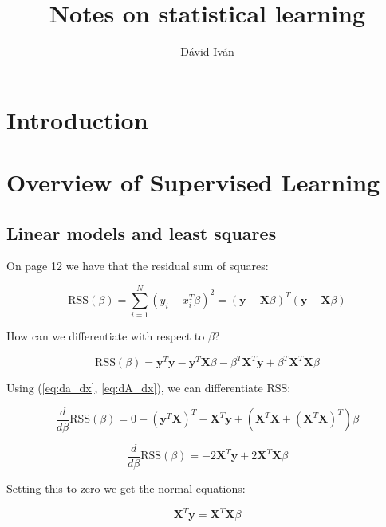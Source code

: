 \documentclass{article}
\title{Notes on statistical learning}
\author{Dávid Iván}
\begin{document}
\maketitle

\tableofcontents

\newpage
\section{Introduction}
\section{Overview of Supervised Learning}
\subsection{Linear models and least squares}

On page 12 we have that the residual sum of squares:

\begin{equation}
    \text{RSS}(\beta) = \sum_{i=1}^{N}(y_i-x_i^T\beta)^2 = (\textbf{y} - \textbf{X}\beta)^T(\textbf{y} - \textbf{X}\beta)
\end{equation}

How can we differentiate with respect to $\beta$?

\begin{equation}
    \text{RSS}(\beta) = \textbf{y}^T\textbf{y} - \textbf{y}^T\textbf{X}\beta - \beta^T \textbf{X}^T \textbf{y} + \beta^T \textbf{X}^T \textbf{X} \beta
\end{equation}

Using (\ref{eq:da_dx}, \ref{eq:dA_dx}), we can differentiate RSS:

\begin{equation}
    \frac{d}{d\beta} \text{RSS}(\beta) = 0 - (\textbf{y}^T \textbf{X})^T - \textbf{X}^T\textbf{y} + (\textbf{X}^T\textbf{X} + (\textbf{X}^T\textbf{X})^T)\beta
\end{equation}

\begin{equation}
    \frac{d}{d\beta} \text{RSS}(\beta) =  -2 \textbf{X}^T\textbf{y} + 2\textbf{X}^T\textbf{X}\beta
\end{equation}

Setting this to zero we get the normal equations:

\begin{equation}
    \textbf{X}^T\textbf{y} = \textbf{X}^T\textbf{X}\beta
\end{equation}
\end{document}
